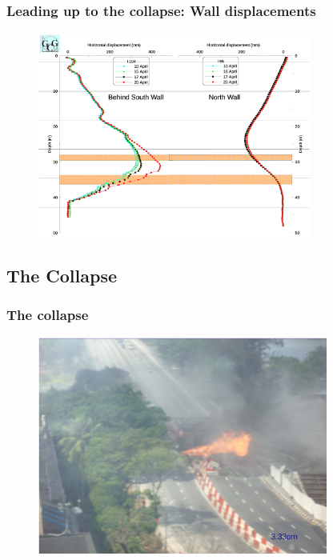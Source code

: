 \documentclass[notes]{beamer}
\begin{document}
\begin{frame}
\frametitle{Leading up to the collapse: Wall displacements}
\begin{figure}[ht]
	\centering
	\includegraphics[width=0.8\textwidth]{figs/disp4.png}
\end{figure}
\end{frame}

\subsection{The Collapse}
\begin{frame}
\frametitle{The collapse}
\begin{figure}[ht]
	\centering
	\includegraphics[width=0.85\textwidth]{figs/collapse1.png}
\end{figure}
\end{frame}
\end{document}
